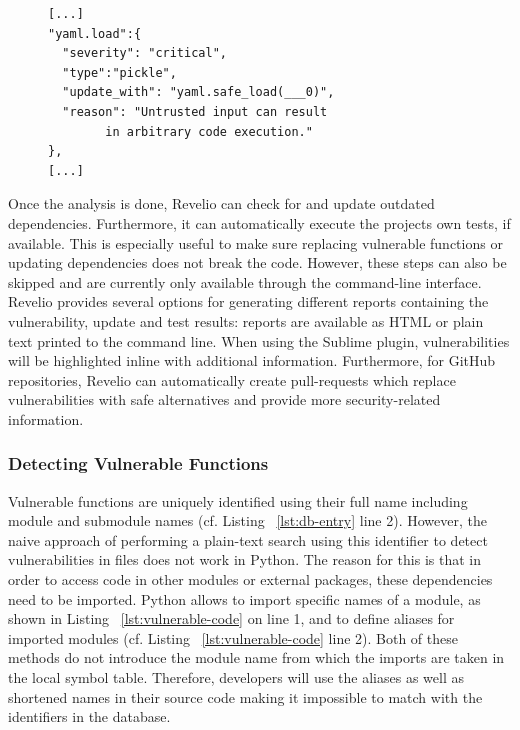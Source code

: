 \begin{figure}[!h]
    \centering
    \begin{lstlisting}[caption={Entry in the vulnerability database},captionpos=b, label={lst:db-entry}]
[...]
"yaml.load":{
  "severity": "critical",
  "type":"pickle",
  "update_with": "yaml.safe_load(___0)",
  "reason": "Untrusted input can result  
        in arbitrary code execution."
},
[...]
\end{lstlisting}
\end{figure}

Once the analysis is done, Revelio can check for and update outdated dependencies. Furthermore, it can automatically execute the projects own tests, if available. This is especially useful to make sure replacing vulnerable functions or updating dependencies does not break the code. However, these steps can also be skipped and are currently only available through the command-line interface. Revelio provides several options for generating different reports containing the vulnerability, update and test results: reports are available as HTML or plain text printed to the command line. When using the Sublime plugin, vulnerabilities will be highlighted inline with additional information. Furthermore, for GitHub repositories, Revelio can automatically create pull-requests which replace vulnerabilities with safe alternatives and provide more security-related information.

\subsubsection{Detecting Vulnerable Functions}


Vulnerable functions are uniquely identified using their full name including module and submodule names (cf. Listing ~\ref{lst:db-entry} line 2). However, the naive approach of performing a plain-text search using this identifier to detect vulnerabilities in files does not work in Python. The reason for this is that in order to access code in other modules or external packages, these dependencies need to be imported. Python allows to import specific names of a module, as shown in Listing ~\ref{lst:vulnerable-code} on line 1, and to define aliases for imported modules (cf. Listing ~\ref{lst:vulnerable-code} line 2). Both of these methods do not introduce the module name from which the imports are taken in the local symbol table. Therefore, developers will use the aliases as well as shortened names in their source code making it impossible to match with the identifiers in the database.

